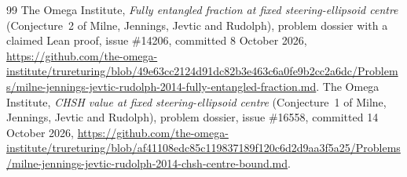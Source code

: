 \documentclass[11pt,a4paper]{article}
\theoremstyle{remark}\newtheorem{remark}[theorem]{Remark}
\begin{document}
\begin{thebibliography}{99}
 The Omega Institute, \emph{Fully entangled fraction at
fixed steering-ellipsoid centre} (Conjecture~2 of Milne, Jennings, Jevtic
and Rudolph), problem dossier with a claimed Lean proof, issue \#14206,
committed 8 October 2026,
\url{https://github.com/the-omega-institute/trureturing/blob/49e63cc2124d91dc82b3e463c6a0fe9b2cc2a6dc/Problems/milne-jennings-jevtic-rudolph-2014-fully-entangled-fraction.md}.
 The Omega Institute, \emph{CHSH value at fixed
steering-ellipsoid centre} (Conjecture~1 of Milne, Jennings, Jevtic and
Rudolph), problem dossier, issue \#16558, committed 14 October 2026,
\url{https://github.com/the-omega-institute/trureturing/blob/af41108edc85c119837189f120c6d2d9aa3f5a25/Problems/milne-jennings-jevtic-rudolph-2014-chsh-centre-bound.md}.
\end{thebibliography}
\end{document}

